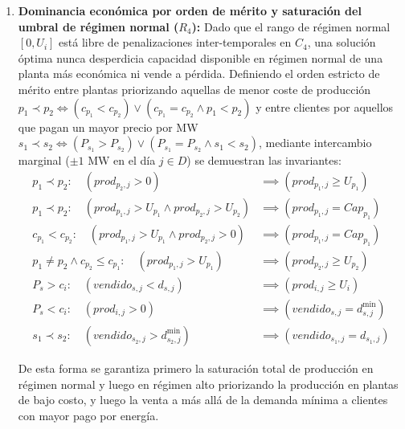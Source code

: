 \begin{enumerate}
    \item \textbf{Dominancia económica por orden de mérito y saturación del umbral de régimen normal ($R_4$):}
    Dado que el rango de régimen normal $[0, U_i]$ está libre de penalizaciones inter-temporales en $C_4$, una solución óptima nunca desperdicia capacidad disponible en régimen normal de una planta más económica ni vende a pérdida. Definiendo el orden estricto de mérito entre plantas priorizando aquellas de menor coste de producción $p_1 \prec p_2 \iff (c_{p_1} < c_{p_2}) \lor (c_{p_1} = c_{p_2} \land p_1 < p_2)$ y entre clientes por aquellos que pagan un mayor precio por MW $s_1 \prec s_2 \iff (P_{s_1} > P_{s_2}) \lor (P_{s_1} = P_{s_2} \land s_1 < s_2)$, mediante intercambio marginal ($\pm 1\text{ MW}$ en el día $j \in D$) se demuestran las invariantes:
    \begin{align}
        p_1 \prec p_2:\quad (prod_{p_2, j} > 0) &\implies (prod_{p_1, j} \ge U_{p_1}) \label{eq:r4_merito_normal} \\
        p_1 \prec p_2:\quad (prod_{p_1, j} > U_{p_1} \land prod_{p_2, j} > U_{p_2}) &\implies (prod_{p_1, j} = Cap_{p_1}) \label{eq:r4_ambas_altas} \\
        c_{p_1} < c_{p_2}:\quad (prod_{p_1, j} > U_{p_1} \land prod_{p_2, j} > 0) &\implies (prod_{p_1, j} = Cap_{p_1}) \label{eq:r4_barata_alta} \\
        p_1 \neq p_2 \land c_{p_2} \le c_{p_1}:\quad (prod_{p_1, j} > U_{p_1}) &\implies (prod_{p_2, j} \ge U_{p_2}) \label{eq:r4_cara_alta} \\
        P_s > c_i:\quad (vendido_{s,j} < d_{s,j}) &\implies (prod_{i,j} \ge U_i) \label{eq:r4_cliente_rentable} \\
        P_s < c_i:\quad (prod_{i,j} > 0) &\implies (vendido_{s,j} = d^{\min}_{s,j}) \label{eq:r4_cliente_perdida} \\
        s_1 \prec s_2:\quad (vendido_{s_2, j} > d^{\min}_{s_2, j}) &\implies (vendido_{s_1, j} = d_{s_1, j}) \label{eq:r4_prioridad_clientes}
    \end{align}

    De esta forma se garantiza primero la saturación total de producción en régimen normal y luego en régimen alto priorizando la producción en plantas de bajo costo, y luego la venta a más allá de la demanda mínima a clientes con mayor pago por energía.


\end{enumerate}
